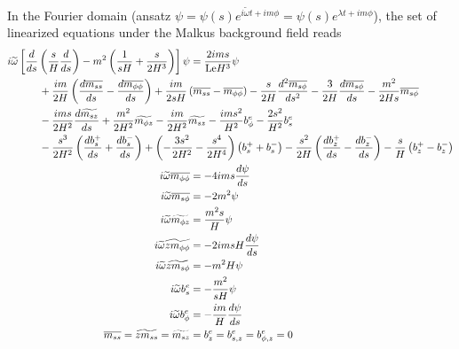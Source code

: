 In the Fourier domain (ansatz $\psi = \psi(s) e^{i\widetilde{\omega}t + im\phi} = \psi(s)e^{\lambda t + im\phi}$), the set of linearized equations under the Malkus background field reads
\begin{equation}\label{eqn:eigen-pg-malkus}
\begin{aligned}
    i\widetilde{\omega} \left[\frac{d}{d s}\left(\frac{s}{H}\frac{d}{d s}\right) - m^2 \left(\frac{1}{sH} + \frac{s}{2H^3}\right)\right] \psi &= \frac{2 i m s}{\mathrm{Le} H^{3}} \psi \\
    &\mkern-260mu + \frac{i m}{2 H} \left( \frac{d \overline{m_{ss}}}{d s} - \frac{d \overline{m_{\phi\phi}}}{d s}\right) + \frac{i m}{2 sH} \left(\overline{m_{ss}} - \overline{m_{\phi\phi}}\right) - \frac{s}{2 H} \frac{d^{2} \overline{m_{s\phi}}}{d s^{2}} - \frac{3}{2 H} \frac{d\overline{m_{s\phi}}}{d s} - \frac{m^{2}}{2 H s} \overline{m_{s\phi}} \\
    &\mkern-260mu - \frac{i m s}{2 H^{2}} \frac{d \widetilde{m_{sz}}}{d s} + \frac{m^{2}}{2 H^{2}} \widetilde{m_{\phi z}} - \frac{i m}{2 H^{2}} \widetilde{m_{sz}} - \frac{i m s^{2}}{H^{2}} b_{\phi}^e - \frac{2 s^{2}}{H^{2}}b_{s}^e \\
    &\mkern-260mu - \frac{s^{3}}{2 H^{2}} \left(\frac{db^{+}_{s}}{d s} + \frac{d b^{-}_{s}}{ds}\right) + \left(- \frac{3 s^{2}}{2 H^{2}} - \frac{s^{4}}{2 H^{4}}\right) \left( b^{+}_{s} + b^{-}_{s} \right) - \frac{s^{2}}{2 H} \left(\frac{d b^{+}_{z}}{d s} - \frac{d b^{-}_{z}}{d s}\right) - \frac{s}{H} \left(b^{+}_{z} - b^{-}_{z}\right)\\
    i \widetilde{\omega} \overline{m_{\phi\phi}} &= - 4 i m s \frac{d \psi}{d s} \\
    i \widetilde{\omega} \overline{m_{s\phi}} &= - 2 m^{2} \psi \\
    i \widetilde{\omega} \widetilde{m_{\phi z}} &= \frac{m^{2} s}{H} \psi \\
    i \widetilde{\omega} \widetilde{zm_{\phi\phi}} &= - 2 i m s H \frac{d \psi}{d s} \\
    i \widetilde{\omega} \widetilde{zm_{s\phi}} &= - m^{2} H \psi\\
    i \widetilde{\omega} b_{s}^e &= - \frac{m^{2}}{s H} \psi \\
    i \widetilde{\omega} b_{\phi}^e &= - \frac{i m}{H} \frac{d \psi}{d s} \\
    \overline{m_{ss}} = \widetilde{zm_{ss}} = \widetilde{m_{sz}} &= b_{z}^e = b_{s, z}^e = b_{\phi, z}^e = 0
\end{aligned}
\end{equation}
